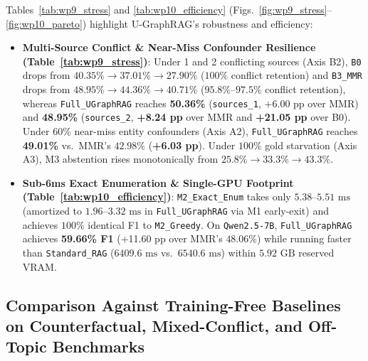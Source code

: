 \documentclass[11pt]{article}
\begin{document}
Tables~\ref{tab:wp9_stress} and \ref{tab:wp10_efficiency} (Figs.~\ref{fig:wp9_stress}--\ref{fig:wp10_pareto}) highlight U-GraphRAG's robustness and efficiency:
\begin{itemize}[leftmargin=*,nosep]
    \item \textbf{Multi-Source Conflict \& Near-Miss Confounder Resilience (Table~\ref{tab:wp9_stress})}: Under 1 and 2 conflicting sources (Axis B2), \texttt{B0} drops from $40.35\% \to 37.01\% \to 27.90\%$ ($100\%$ conflict retention) and \texttt{B3\_MMR} drops from $48.95\% \to 44.36\% \to 40.71\%$ ($95.8\%\text{--}97.5\%$ conflict retention), whereas \texttt{Full\_UGraphRAG} reaches \textbf{50.36\%} (\texttt{sources\_1}, $+6.00\text{ pp}$ over MMR) and \textbf{48.95\%} (\texttt{sources\_2}, \textbf{+8.24 pp} over MMR and \textbf{+21.05 pp} over B0). Under $60\%$ near-miss entity confounders (Axis A2), \texttt{Full\_UGraphRAG} reaches \textbf{49.01\%} vs.\ MMR's $42.98\%$ (\textbf{+6.03 pp}). Under $100\%$ gold starvation (Axis A3), M3 abstention rises monotonically from $25.8\% \to 33.3\% \to \mathbf{43.3\%}$.
    \item \textbf{Sub-6ms Exact Enumeration \& Single-GPU Footprint (Table~\ref{tab:wp10_efficiency})}: \texttt{M2\_Exact\_Enum} takes only $5.38\text{--}5.51\text{ ms}$ (amortized to $1.96\text{--}3.32\text{ ms}$ in \texttt{Full\_UGraphRAG} via M1 early-exit) and achieves $100\%$ identical F1 to \texttt{M2\_Greedy}. On \texttt{Qwen2.5-7B}, \texttt{Full\_UGraphRAG} achieves \textbf{59.66\% F1} (+11.60 pp over MMR's $48.06\%$) while running faster than \texttt{Standard\_RAG} ($6409.6\text{ ms}$ vs.\ $6540.6\text{ ms}$) within $5.92\text{ GB}$ reserved VRAM.
\end{itemize}

\subsection{Comparison Against Training-Free Baselines on Counterfactual, Mixed-Conflict, and Off-Topic Benchmarks}
\label{sec:extended_cmp}
\end{document}
